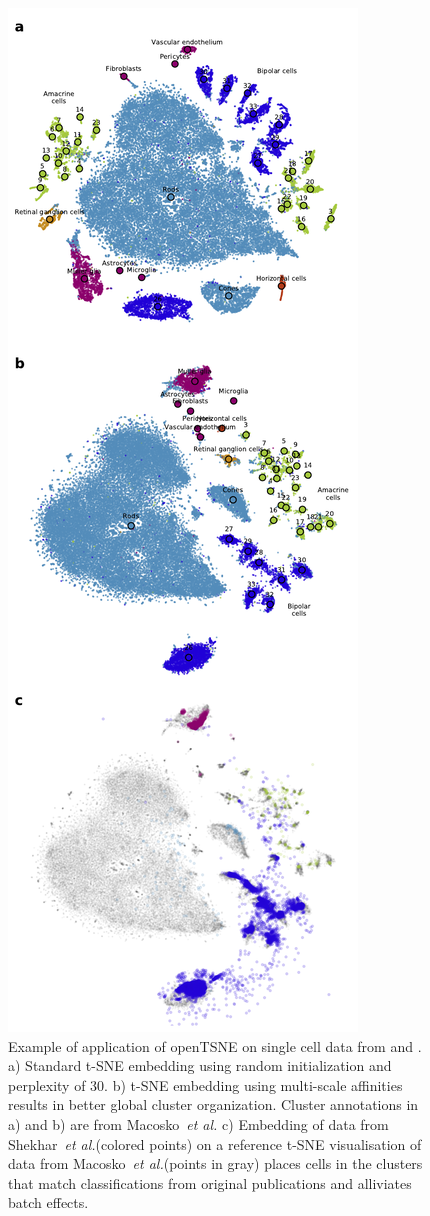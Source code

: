 \documentclass{bioinfo}
\def\etal{{\em et al.}\xspace}
\begin{document}
\begin{figure}[htbp]
\centerline{\includegraphics[width=0.7\linewidth]{policar-fig-1}}
\caption{Example of application of openTSNE on single cell data from \citet{Macosko2015} and \citet{Shekhar2016}. a) Standard t-SNE embedding using random initialization and perplexity of 30. b) t-SNE embedding using multi-scale affinities results in better global cluster organization. Cluster annotations in a) and b) are from Macosko~\etal c) Embedding of data from Shekhar~\etal (colored points) on a reference t-SNE visualisation of data from Macosko~\etal (points in gray) places cells in the clusters that match classifications from original publications and alliviates batch effects.}
\label{fig:tsne}
\end{figure}
\end{document}
